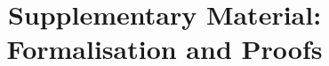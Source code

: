 \documentclass[runningheads]{llncs}
\newif\ifanonymous
\begin{document}
\sloppy

\title{Supplementary Material: Formalisation and Proofs}
\ifanonymous
  \author{Anonymous Author(s)}
  \authorrunning{Anonymous}
  \institute{Anonymous Institution(s)}
\fi
\maketitle











\end{document}
